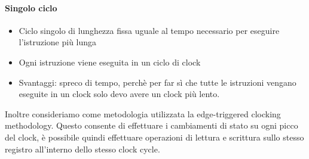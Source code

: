 \documentclass[12pt, a4paper, openany]{book}
\begin{document}
\paragraph*{Singolo ciclo} \begin{itemize}
    \item Ciclo singolo di lunghezza fissa uguale al tempo necessario per eseguire l'istruzione
    più lunga
    \item Ogni istruzione viene eseguita in un ciclo di clock
    \item Svantaggi: spreco di tempo, perchè per far sì che tutte le istruzioni vengano eseguite in 
    un clock solo devo avere un clock più lento.
\end{itemize}
Inoltre consideriamo come metodologia utilizzata la edge-triggered clocking methodology.
Questo consente di effettuare i cambiamenti di stato su ogni picco del clock, è possibile
quindi effettuare operazioni di lettura e scrittura sullo stesso registro all'interno dello stesso clock
cycle.
\end{document}
